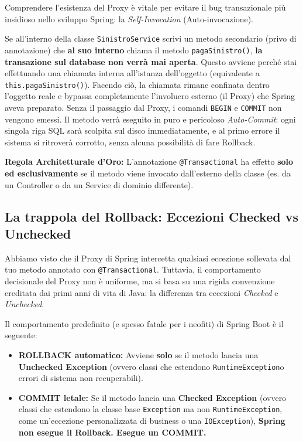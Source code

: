 \begin{warningbox}
Comprendere l'esistenza del Proxy è vitale per evitare il bug transazionale più insidioso nello sviluppo Spring: la \textit{Self-Invocation} (Auto-invocazione).

Se all'interno della classe \texttt{SinistroService} scrivi un metodo secondario (privo di annotazione) che \textbf{al suo interno} chiama il metodo \texttt{pagaSinistro()}, \textbf{la transazione sul database non verrà mai aperta}.
Questo avviene perché stai effettuando una chiamata interna all'istanza dell'oggetto (equivalente a \texttt{this.pagaSinistro()}). Facendo ciò, la chiamata rimane confinata dentro l'oggetto reale e bypassa completamente l'involucro esterno (il Proxy) che Spring aveva preparato. 
Senza il passaggio dal Proxy, i comandi \texttt{BEGIN} e \texttt{COMMIT} non vengono emessi. Il metodo verrà eseguito in puro e pericoloso \textit{Auto-Commit}: ogni singola riga SQL sarà scolpita sul disco immediatamente, e al primo errore il sistema si ritroverà corrotto, senza alcuna possibilità di fare Rollback.

\textbf{Regola Architetturale d'Oro:} L'annotazione \texttt{@Transactional} ha effetto \textbf{solo ed esclusivamente} se il metodo viene invocato dall'esterno della classe (es. da un Controller o da un Service di dominio differente).
\end{warningbox}

\subsection{La trappola del Rollback: Eccezioni Checked vs Unchecked}

Abbiamo visto che il Proxy di Spring intercetta qualsiasi eccezione sollevata dal tuo metodo annotato con \texttt{@Transactional}. Tuttavia, il comportamento decisionale del Proxy non è uniforme, ma si basa su una rigida convenzione ereditata dai primi anni di vita di Java: la differenza tra eccezioni \textit{Checked} e \textit{Unchecked}.

Il comportamento predefinito (e spesso fatale per i neofiti) di Spring Boot è il seguente:
\begin{itemize}
    \item \textbf{ROLLBACK automatico:} Avviene \textbf{solo} se il metodo lancia una \textbf{Unchecked Exception} (ovvero classi che estendono \texttt{RuntimeException}o errori di sistema non recuperabili).
    \item \textbf{COMMIT letale:} Se il metodo lancia una \textbf{Checked Exception} (ovvero classi che estendono la classe base \texttt{Exception} ma non \texttt{RuntimeException}, come un'eccezione personalizzata di business o una \texttt{IOException}), \textbf{Spring non esegue il Rollback. Esegue un COMMIT.}
\end{itemize}

